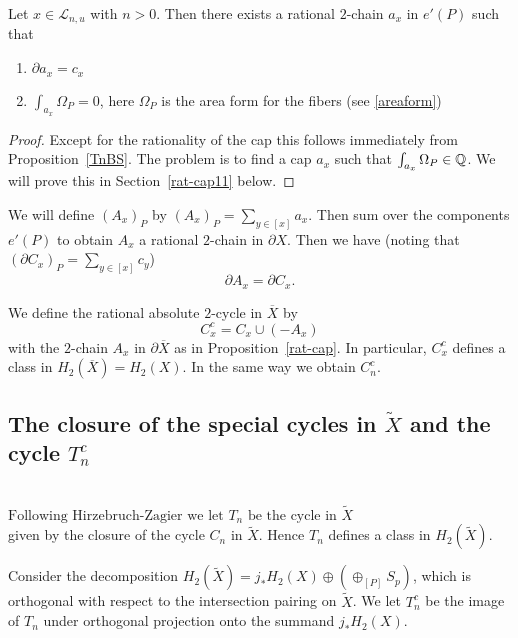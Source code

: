 \begin{proposition}\label{rat-cap}
Let $x \in \mathcal{L}_{n,u}$ with $n>0$. Then there exists a rational $2$-chain $a_x$ in $e'(P)$ such that
\begin{enumerate}
\item $\partial a_x = c_x$
\item $\int_{a_x} \Omega_P = 0$, here $\Omega_P$ is the area form for the fibers (see \eqref{areaform}) 
\end{enumerate}

\end{proposition}
 

\begin{proof}

Except for the rationality of the cap this follows immediately from Proposition~\ref{TnBS}. The problem is to find a cap $a_x$ such that $\int_{a_x} \Omega_P \in \mathbb{Q}$. We will prove this in Section~\ref{rat-cap11} below. 
\end{proof}

We will define $(A_x)_P$ by $(A_x)_P = \sum_{y \in [x]} a_x$. Then sum over the components $e'(P)$ to obtain $A_x$ a rational $2$-chain 
in $\partial X$. Then we have (noting that $(\partial C_x)_P = \sum_{y \in [x]} c_y$)
\[
\partial A_x = \partial C_x.
\]




\begin{definition}
We define the rational absolute $2$-cycle in $\overline{X}$ by 
\[
C_x^c = C_x \cup (-A_x)
\]
with the $2$-chain $A_x$  in $\partial \overline{X}$ as in Proposition~\ref{rat-cap}. In particular, $C_x^c$ defines a class in $H_2(\overline{X}) = H_2(X)$. In the same way we obtain $C_n^c$. 
\end{definition}


\subsection{The closure of the special cycles in $\tilde{X}$ and the cycle $T_n^c$}
\ \\
$\text{Following Hirzebruch-Zagier we let $T_n$ be the cycle in $\tilde{X}$}$\\ given by the closure of the cycle $C_n$ in $\tilde{X}$. Hence $T_n$ defines a class in $H_2(\tilde{X})$.


\begin{definition}
Consider the decomposition $H_2(\tilde{X}) = j_{\ast} H_2(X) \oplus \left( \oplus_{[P]} S_{p
} \right)$, which is orthogonal with respect to the intersection pairing on $\tilde{X}$. We let $T_n^c$ be the image of $T_n$ under orthogonal projection onto the summand $j_{\ast} H_2(X)$.
\end{definition}

